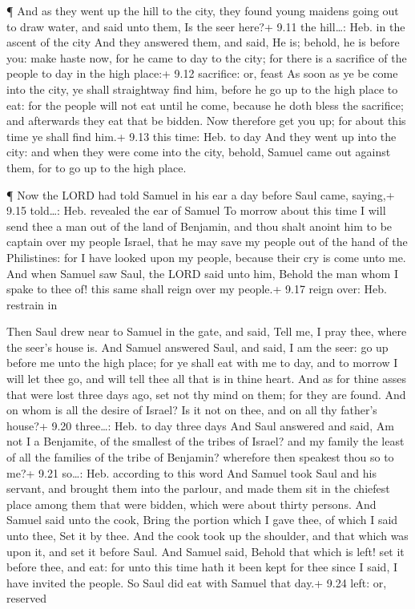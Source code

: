  ¶ And as they went up the hill to the city, they found
young maidens going out to draw water, and said unto them, Is the seer
here?+ 9.11 the hill\ldots: Heb. in the ascent of the city 
And they answered them, and said, He is; behold, he is before you: make
haste now, for he came to day to the city; for there is a sacrifice of
the people to day in the high place:+ 9.12 sacrifice: or, feast
 As soon as ye be come into the city, ye shall straightway
find him, before he go up to the high place to eat: for the people will
not eat until he come, because he doth bless the sacrifice; and
afterwards they eat that be bidden. Now therefore get you up; for about
this time ye shall find him.+ 9.13 this time: Heb. to day 
And they went up into the city: and when they were come into the city,
behold, Samuel came out against them, for to go up to the high place.

 ¶ Now the LORD had told Samuel in his ear a day before
Saul came, saying,+ 9.15 told\ldots: Heb. revealed the ear of Samuel
 To morrow about this time I will send thee a man out of
the land of Benjamin, and thou shalt anoint him to be captain over my
people Israel, that he may save my people out of the hand of the
Philistines: for I have looked upon my people, because their cry is come
unto me.  And when Samuel saw Saul, the LORD said unto him,
Behold the man whom I spake to thee of! this same shall reign over my
people.+ 9.17 reign over: Heb. restrain in

 Then Saul drew near to Samuel in the gate, and said, Tell
me, I pray thee, where the seer's house is.  And Samuel
answered Saul, and said, I am the seer: go up before me unto the high
place; for ye shall eat with me to day, and to morrow I will let thee
go, and will tell thee all that is in thine heart.  And as
for thine asses that were lost three days ago, set not thy mind on them;
for they are found. And on whom is all the desire of Israel? Is it not
on thee, and on all thy father's house?+ 9.20 three\ldots: Heb. to day
three days  And Saul answered and said, Am not I a
Benjamite, of the smallest of the tribes of Israel? and my family the
least of all the families of the tribe of Benjamin? wherefore then
speakest thou so to me?+ 9.21 so\ldots: Heb. according to this word
 And Samuel took Saul and his servant, and brought them
into the parlour, and made them sit in the chiefest place among them
that were bidden, which were about thirty persons.  And
Samuel said unto the cook, Bring the portion which I gave thee, of which
I said unto thee, Set it by thee.  And the cook took up the
shoulder, and that which was upon it, and set it before Saul. And Samuel
said, Behold that which is left! set it before thee, and eat: for unto
this time hath it been kept for thee since I said, I have invited the
people. So Saul did eat with Samuel that day.+ 9.24 left: or, reserved

